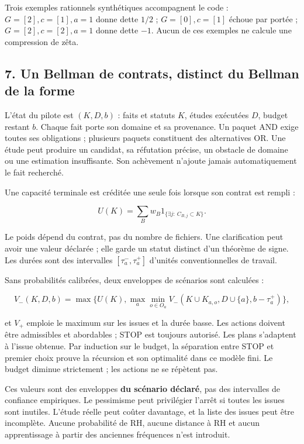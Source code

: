 \documentclass[
  10pt,
  a4paper,
]{article}
\begin{document}
Trois exemples rationnels synthétiques accompagnent le code :
\(G=[2],c=[1],a=1\) donne dette \(1/2\) ; \(G=[0],c=[1]\) échoue par
portée ; \(G=[2],c=[2],a=1\) donne dette \(-1\). Aucun de ces exemples
ne calcule une compression de zêta.

\newpage

\hypertarget{un-bellman-de-contrats-distinct-du-bellman-de-la-forme}{%
\subsection{7. Un Bellman de contrats, distinct du Bellman de la
forme}\label{un-bellman-de-contrats-distinct-du-bellman-de-la-forme}}

L'état du pilote est \((K,D,b)\) : faits et statuts \(K\), études
exécutées \(D\), budget restant \(b\). Chaque fait porte son domaine et
sa provenance. Un paquet AND exige toutes ses obligations ; plusieurs
paquets constituent des alternatives OR. Une étude peut produire un
candidat, sa réfutation précise, un obstacle de domaine ou une
estimation insuffisante. Son achèvement n'ajoute jamais automatiquement
le fait recherché.

Une capacité terminale est créditée une seule fois lorsque son contrat
est rempli :

\[
U(K)=\sum_B w_B1_{\{\exists j:\ C_{B,j}\subset K\}}.
\]

Le poids dépend du contrat, pas du nombre de fichiers. Une clarification
peut avoir une valeur déclarée ; elle garde un statut distinct d'un
théorème de signe. Les durées sont des intervalles
\([\tau_a^-,\tau_a^+]\) d'unités conventionnelles de travail.

Sans probabilités calibrées, deux enveloppes de scénarios sont calculées
:

\[
V_-(K,D,b)=\max\{U(K),\max_a\min_{o\in O_a}
V_-(K\cup K_{a,o},D\cup\{a\},b-\tau_a^+)\},
\]

et \(V_+\) emploie le maximum sur les issues et la durée basse. Les
actions doivent être admissibles et abordables ; STOP est toujours
autorisé. Les plans s'adaptent à l'issue obtenue. Par induction sur le
budget, la séparation entre STOP et premier choix prouve la récursion et
son optimalité dans ce modèle fini. Le budget diminue strictement ; les
actions ne se répètent pas.

Ces valeurs sont des enveloppes \textbf{du scénario déclaré}, pas des
intervalles de confiance empiriques. Le pessimisme peut privilégier
l'arrêt si toutes les issues sont inutiles. L'étude réelle peut coûter
davantage, et la liste des issues peut être incomplète. Aucune
probabilité de RH, aucune distance à RH et aucun apprentissage à partir
des anciennes fréquences n'est introduit.
\end{document}
